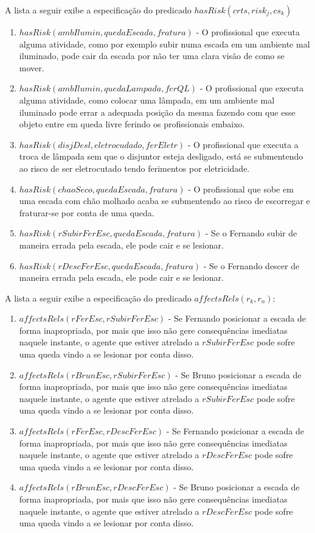 A lista a seguir exibe a especificação do predicado $hasRisk(crts,risk_j,cs_k)$

\begin{enumerate}
	\item $hasRisk(ambIlumin,quedaEscada,fratura)$ - O profissional que executa alguma atividade, como por exemplo subir numa escada em um ambiente mal iluminado, pode cair da escada por não ter uma clara visão de como se mover. 
	\item $hasRisk(ambIlumin,quedaLampada,ferQL)$ - O profissional que executa alguma atividade, como colocar uma lâmpada, em um ambiente mal iluminado pode errar a adequada posição da mesma fazendo com que esse objeto entre em queda livre ferindo os profissionais embaixo.
	\item $hasRisk(disjDesl, eletrocudado, ferEletr)$ - O profissional que executa a troca de lâmpada sem que o disjuntor esteja desligado, está se submentendo ao risco de ser eletrocutado tendo ferimentos por eletricidade.
	\item $hasRisk(chaoSeco,quedaEscada,fratura)$ - O profissional que sobe em uma escada com chão molhado acaba se submentendo ao risco de escorregar e fraturar-se por conta de uma queda.
	\item $hasRisk(rSubirFerEsc,quedaEscada,fratura)$ - Se o Fernando subir de maneira errada pela escada, ele pode cair e se lesionar. 
	\item $hasRisk(rDescFerEsc,quedaEscada,fratura)$ - Se o Fernando descer de maneira errada pela escada, ele pode cair e se lesionar. 		
\end{enumerate}

A lista a seguir exibe a especificação do predicado $affectsRels(r_k,r_n)$:

\begin{enumerate}
	\item $affectsRels(rFerEsc,rSubirFerEsc)$ - Se Fernando posicionar a escada de forma inapropriada, por mais que isso não gere consequências imediatas naquele instante, o agente que estiver atrelado a $rSubirFerEsc$ pode sofre uma queda vindo a se lesionar por conta disso. 
	\item $affectsRels(rBrunEsc,rSubirFerEsc)$ - Se Bruno posicionar a escada de forma inapropriada, por mais que isso não gere consequências imediatas naquele instante, o agente que estiver atrelado a $rSubirFerEsc$ pode sofre uma queda vindo a se lesionar por conta disso. 
	\item $affectsRels(rFerEsc,rDescFerEsc)$ - Se Fernando posicionar a escada de forma inapropriada, por mais que isso não gere consequências imediatas naquele instante, o agente que estiver atrelado a $rDescFerEsc$ pode sofre uma queda vindo a se lesionar por conta disso. 
	\item $affectsRels(rBrunEsc,rDescFerEsc)$ - Se Bruno posicionar a escada de forma inapropriada, por mais que isso não gere consequências imediatas naquele instante, o agente que estiver atrelado a $rDescFerEsc$ pode sofre uma queda vindo a se lesionar por conta disso. 
\end{enumerate}

